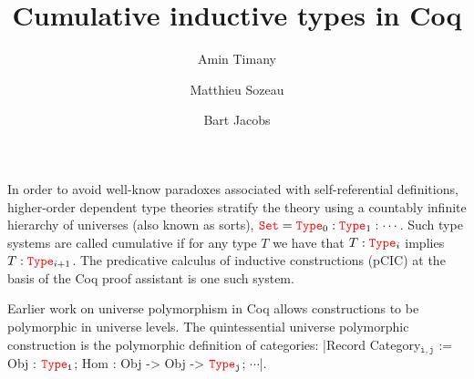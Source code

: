 \documentclass{easychair}
\title{Cumulative inductive types in Coq}
\author{
Amin Timany\inst{1}
\and
Matthieu Sozeau\inst{2}
\and
Bart Jacobs\inst{1}
}
\institute{
imec-Distrinet, KuLeuven, Belgium
\and
Inria Paris \& IRIF, France, \email{matthieu.sozeau@inria.fr}
 }
\newcommand{\Type}[1]{{\color{red} \mathtt{Type}}_{#1}}
\newcommand{\Set}{{\color{red} \mathtt{Set}}}
\begin{document}
\maketitle

In order to avoid well-know paradoxes associated with self-referential
definitions, higher-order dependent type theories stratify the theory using a
countably infinite hierarchy of universes (also known as sorts),
$\Set = \Type{0} : \Type{1} : \cdots$. Such type systems are called
cumulative if for any type $T$ we have that $T : \Type{i}$ implies
$T : \Type{i+1}$. The predicative calculus of inductive constructions
(pCIC) \cite{coq, DBLP:journals/corr/abs-1111-0123} at the basis of the Coq proof assistant is one such
system.

Earlier work \cite{DBLP:conf/itp/SozeauT14} on universe polymorphism
in Coq allows constructions to be polymorphic in universe levels.  The
quintessential universe polymorphic construction is the polymorphic definition of
categories:
\Coqe|Record Category$_{\mathtt{i, j}}$ := {Obj : $\Type{\mathtt{i}}$; Hom : Obj -> Obj -> $\Type{\mathtt{j}}$; $\cdots$}|.\footnotemark{}
\end{document}
